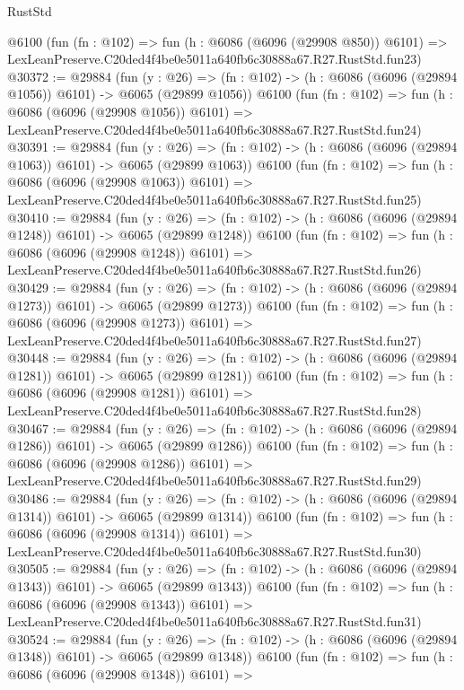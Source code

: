 \begin{lexlean}{RustStd}
\begin{coremodule}
    @6100
    (fun (fn : @102) =>
    fun (h : @6086 (@6096 (@29908 @850)) @6101) =>
    LexLeanPreserve.C20ded4f4be0e5011a640fb6c30888a67.R27.RustStd.fun23)
@30372 := @29884
    (fun (y : @26) =>
    (fn : @102) -> (h : @6086 (@6096 (@29894 @1056)) @6101) -> @6065 (@29899 @1056))
    @6100
    (fun (fn : @102) =>
    fun (h : @6086 (@6096 (@29908 @1056)) @6101) =>
    LexLeanPreserve.C20ded4f4be0e5011a640fb6c30888a67.R27.RustStd.fun24)
@30391 := @29884
    (fun (y : @26) =>
    (fn : @102) -> (h : @6086 (@6096 (@29894 @1063)) @6101) -> @6065 (@29899 @1063))
    @6100
    (fun (fn : @102) =>
    fun (h : @6086 (@6096 (@29908 @1063)) @6101) =>
    LexLeanPreserve.C20ded4f4be0e5011a640fb6c30888a67.R27.RustStd.fun25)
@30410 := @29884
    (fun (y : @26) =>
    (fn : @102) -> (h : @6086 (@6096 (@29894 @1248)) @6101) -> @6065 (@29899 @1248))
    @6100
    (fun (fn : @102) =>
    fun (h : @6086 (@6096 (@29908 @1248)) @6101) =>
    LexLeanPreserve.C20ded4f4be0e5011a640fb6c30888a67.R27.RustStd.fun26)
@30429 := @29884
    (fun (y : @26) =>
    (fn : @102) -> (h : @6086 (@6096 (@29894 @1273)) @6101) -> @6065 (@29899 @1273))
    @6100
    (fun (fn : @102) =>
    fun (h : @6086 (@6096 (@29908 @1273)) @6101) =>
    LexLeanPreserve.C20ded4f4be0e5011a640fb6c30888a67.R27.RustStd.fun27)
@30448 := @29884
    (fun (y : @26) =>
    (fn : @102) -> (h : @6086 (@6096 (@29894 @1281)) @6101) -> @6065 (@29899 @1281))
    @6100
    (fun (fn : @102) =>
    fun (h : @6086 (@6096 (@29908 @1281)) @6101) =>
    LexLeanPreserve.C20ded4f4be0e5011a640fb6c30888a67.R27.RustStd.fun28)
@30467 := @29884
    (fun (y : @26) =>
    (fn : @102) -> (h : @6086 (@6096 (@29894 @1286)) @6101) -> @6065 (@29899 @1286))
    @6100
    (fun (fn : @102) =>
    fun (h : @6086 (@6096 (@29908 @1286)) @6101) =>
    LexLeanPreserve.C20ded4f4be0e5011a640fb6c30888a67.R27.RustStd.fun29)
@30486 := @29884
    (fun (y : @26) =>
    (fn : @102) -> (h : @6086 (@6096 (@29894 @1314)) @6101) -> @6065 (@29899 @1314))
    @6100
    (fun (fn : @102) =>
    fun (h : @6086 (@6096 (@29908 @1314)) @6101) =>
    LexLeanPreserve.C20ded4f4be0e5011a640fb6c30888a67.R27.RustStd.fun30)
@30505 := @29884
    (fun (y : @26) =>
    (fn : @102) -> (h : @6086 (@6096 (@29894 @1343)) @6101) -> @6065 (@29899 @1343))
    @6100
    (fun (fn : @102) =>
    fun (h : @6086 (@6096 (@29908 @1343)) @6101) =>
    LexLeanPreserve.C20ded4f4be0e5011a640fb6c30888a67.R27.RustStd.fun31)
@30524 := @29884
    (fun (y : @26) =>
    (fn : @102) -> (h : @6086 (@6096 (@29894 @1348)) @6101) -> @6065 (@29899 @1348))
    @6100
    (fun (fn : @102) =>
    fun (h : @6086 (@6096 (@29908 @1348)) @6101) =>

\end{coremodule}
\end{lexlean}
